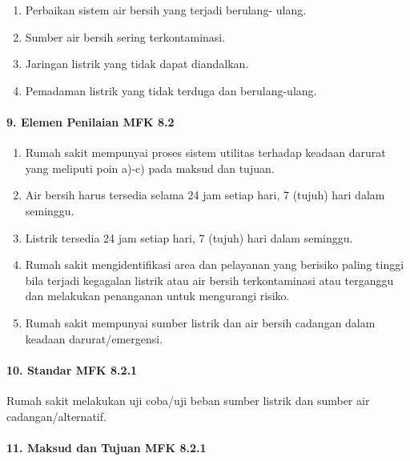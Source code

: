 \documentclass[
]{book}
\providecommand{\tightlist}{%
  \setlength{\itemsep}{0pt}\setlength{\parskip}{0pt}}
\begin{document}
\begin{enumerate}
\def\labelenumi{\arabic{enumi}.}
\tightlist
\item
  Perbaikan sistem air bersih yang terjadi berulang- ulang.
\item
  Sumber air bersih sering terkontaminasi.
\item
  Jaringan listrik yang tidak dapat diandalkan.
\item
  Pemadaman listrik yang tidak terduga dan berulang-ulang.
\end{enumerate}

\hypertarget{elemen-penilaian-mfk-8.2}{%
\paragraph*{9. Elemen Penilaian MFK 8.2}\label{elemen-penilaian-mfk-8.2}}

\begin{enumerate}
\def\labelenumi{\alph{enumi}.}
\tightlist
\item
  Rumah sakit mempunyai proses sistem utilitas terhadap keadaan darurat yang meliputi poin a)-c) pada maksud dan tujuan.
\item
  Air bersih harus tersedia selama 24 jam setiap hari, 7 (tujuh) hari dalam seminggu.
\item
  Listrik tersedia 24 jam setiap hari, 7 (tujuh) hari dalam seminggu.
\item
  Rumah sakit mengidentifikasi area dan pelayanan yang berisiko paling tinggi bila terjadi kegagalan listrik atau air bersih terkontaminasi atau terganggu dan melakukan penanganan untuk mengurangi risiko.
\item
  Rumah sakit mempunyai sumber listrik dan air bersih cadangan dalam keadaan darurat/emergensi.
\end{enumerate}

\hypertarget{standar-mfk-8.2.1}{%
\paragraph*{10. Standar MFK 8.2.1}\label{standar-mfk-8.2.1}}

Rumah sakit melakukan uji coba/uji beban sumber listrik dan sumber air cadangan/alternatif.

\hypertarget{maksud-dan-tujuan-mfk-8.2.1}{%
\paragraph*{11. Maksud dan Tujuan MFK 8.2.1}\label{maksud-dan-tujuan-mfk-8.2.1}}
\end{document}
